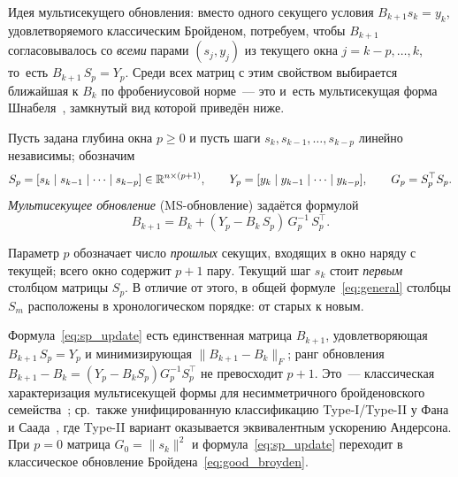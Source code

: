 \medskip

Идея мультисекущего обновления: вместо одного секущего условия
$B_{k+1} s_k = y_k$, удовлетворяемого классическим Бройденом, потребуем,
чтобы $B_{k+1}$ согласовывалось со \emph{всеми} парами $(s_j, y_j)$ из
текущего окна $j = k{-}p, \ldots, k$, то~есть
$B_{k+1}\,S_p = Y_p$. Среди всех матриц с этим свойством выбирается
ближайшая к $B_k$ по фробениусовой норме~--- это и~есть мультисекущая
форма Шнабеля~\cite{schnabel1983}, замкнутый вид которой приведён
ниже.

\begin{definition}\label{def:sp_update}
Пусть задана глубина окна $p \geq 0$ и пусть шаги
$s_k, s_{k-1}, \ldots, s_{k-p}$ линейно независимы; обозначим
\[
  S_p = [s_k \mid s_{k-1} \mid \cdots \mid s_{k-p}] \in \mathbb{R}^{n\times(p+1)},
  \qquad
  Y_p = [y_k \mid y_{k-1} \mid \cdots \mid y_{k-p}],
  \qquad
  G_p = S_p^\top S_p.
\]
\emph{Мультисекущее обновление} (MS-обновление) задаётся формулой
\begin{equation}\label{eq:sp_update}
  B_{k+1} = B_k + (Y_p - B_k\,S_p)\,G_p^{-1}\,S_p^\top.
\end{equation}
\end{definition}

\begin{remark}\label{rem:notation}
Параметр $p$ обозначает число \emph{прошлых} секущих, входящих в окно
наряду с текущей; всего окно содержит $p+1$ пару. Текущий шаг $s_k$
стоит \emph{первым} столбцом матрицы $S_p$. В отличие от этого,
в общей формуле~\eqref{eq:general} столбцы $S_m$ расположены в
хронологическом порядке: от старых к новым.
\end{remark}

\begin{remark}\label{rem:ms_minfrob}
Формула~\eqref{eq:sp_update} есть единственная матрица $B_{k+1}$,
удовлетворяющая $B_{k+1}\,S_p = Y_p$ и минимизирующая $\|B_{k+1} - B_k\|_F$;
ранг обновления $B_{k+1} - B_k = (Y_p - B_k S_p) G_p^{-1} S_p^\top$ не
превосходит $p+1$. Это~--- классическая характеризация мультисекущей
формы для несимметричного бройденовского семейства~\cite[ур.~(2.5)]{schnabel1983};
ср.~также унифицированную классификацию Type-I/Type-II у Фана и
Саада~\cite[ур.~(26)]{fang2009}, где Type-II вариант оказывается
эквивалентным ускорению Андерсона.
При $p=0$ матрица $G_0 = \|s_k\|^2$ и формула~\eqref{eq:sp_update}
переходит в классическое обновление Бройдена~\eqref{eq:good_broyden}.
\end{remark}

